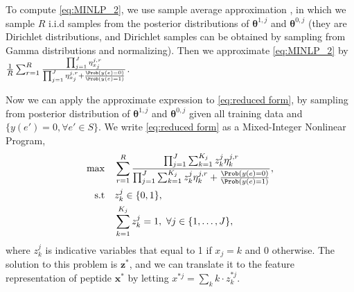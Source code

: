 To compute \eqref{eq:MINLP_2}, we use sample average approximation \citep{kleywegt2002sample}, in which we sample 
$R$ i.i.d samples from the posterior distributions of $\bm{\theta}^{1, j}$ and $\bm{\theta}^{0, j}$ 
(they are Dirichlet distributions, and Dirichlet samples can be obtained by sampling from Gamma distributions and normalizing). 
Then we approximate \eqref{eq:MINLP_2} by $\frac{1}{R} \sum_{r = 1}^R \frac{\prod_{j=1}^J \eta^{j, r}_{x_j}}{\prod_{j=1}^J \eta^{j, r}_{x_j} + \frac{\Prob \left(y(e) = 0 \right)}{\Prob \left( y(e) = 1 \right)}}$.

Now we can apply the approximate expression to \eqref{eq:reduced form}, by sampling from posterior distribution of 
$\bm{\theta}^{1, j}$ and $\bm{\theta}^{0, j}$ given all training data and $\{y(e') = 0, \forall e' \in S\}$. We write 
\eqref{eq:reduced form} as a Mixed-Integer Nonlinear Program,
\begin{equation}
  \begin{split}
    \max \quad & \sum_{r = 1}^R \frac{\prod_{j=1}^J \sum_{k=1}^{K_j} z^j_k \eta^{j, r}_k}
    {\prod_{j=1}^J \sum_{k=1}^{K_j} z^j_k \eta^{j, r}_k + \frac{\Prob \left(y(e) = 0 \right)}{\Prob \left( y(e) = 1 \right)}}, \\
    \text{s.t} \quad &z^j_k \in \{0,1\}, \\
    &\sum_{k=1}^{K_j} z^j_k = 1, \,\, \forall j \in \{1, \ldots, J\},
  \end{split}
  \label{eq:MINLP_4}
\end{equation}
where $z^j_k$ is indicative variables that equal to 1 if $x_j = k$ and 0 otherwise. The solution to this problem is $\bm{z}^*$, 
and we can translate it to the feature representation of peptide $\bm{x}^*$ by letting $x^{*j} = \sum_k k \cdot z^{*j}_k$.

